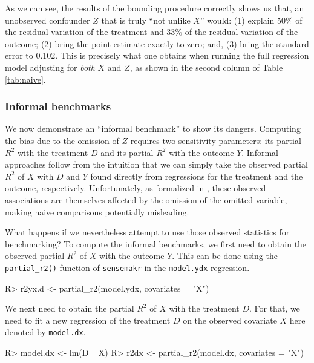 \documentclass[
]{jss}
\begin{document}
As we can see, the results of the bounding procedure correctly shows us
that, an unobserved confounder \(Z\) that is truly ``not unlike \(X\)''
would: (1) explain 50\% of the residual variation of the treatment and
33\% of the residual variation of the outcome; (2) bring the point
estimate exactly to zero; and, (3) bring the standard error to 0.102.
This is precisely what one obtains when running the full regression
model adjusting for \emph{both} \(X\) and \(Z\), as shown in the second
column of Table \ref{tab:naive}.

\hypertarget{informal-benchmarks}{%
\subsubsection{Informal benchmarks}\label{informal-benchmarks}}

We now demonstrate an ``informal benchmark'' to show its dangers.
Computing the bias due to the omission of \(Z\) requires two sensitivity
parameters: its partial \(R^2\) with the treatment \(D\) and its partial
\(R^2\) with the outcome \(Y\). Informal approaches follow from the
intuition that we can simply take the observed partial \(R^2\) of \(X\)
with \(D\) and \(Y\) found directly from regressions for the treatment
and the outcome, respectively. Unfortunately, as formalized in
\cite{cinelli:jrssb2019}, these observed associations are themselves
affected by the omission of the omitted variable, making naive
comparisons potentially misleading.

What happens if we nevertheless attempt to use those observed statistics
for benchmarking? To compute the informal benchmarks, we first need to
obtain the observed partial \(R^2\) of \(X\) with the outcome \(Y\).
This can be done using the \texttt{partial\_r2()} function of
\texttt{sensemakr} in the \texttt{model.ydx} regression.

\begin{CodeChunk}

\begin{CodeInput}
R> r2yx.d <- partial_r2(model.ydx, covariates = "X")
\end{CodeInput}
\end{CodeChunk}

We next need to obtain the partial \(R^2\) of \(X\) with the treatment
\(D\). For that, we need to fit a new regression of the treatment \(D\)
on the observed covariate \(X\) here denoted by \texttt{model.dx}.

\begin{CodeChunk}

\begin{CodeInput}
R> model.dx <- lm(D ~ X)
R> r2dx   <- partial_r2(model.dx, covariates = "X")
\end{CodeInput}
\end{CodeChunk}
\end{document}
